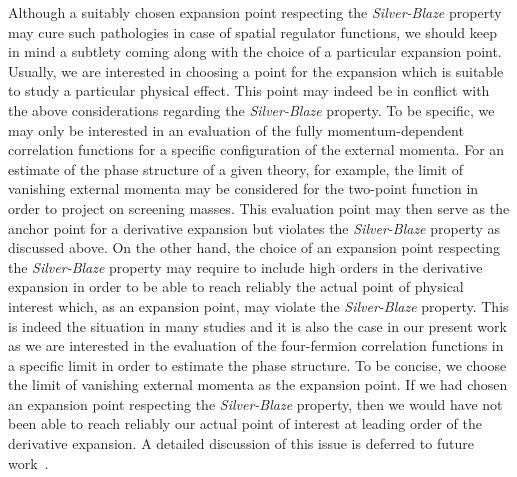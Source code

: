 \documentclass[prd,english,preprintnumbers,amsmath,amssymb,nofootinbib,twocolumn,superscriptaddress]{revtex4-1}
\begin{document}
{{Although a suitably chosen expansion point respecting the {\it Silver-Blaze} property may cure
such pathologies in case of spatial regulator functions, we should keep in mind 
a subtlety coming along with the choice of a particular expansion point. Usually,
we are interested in choosing a point for the expansion which is suitable to study a particular physical effect. 
This point may indeed be in conflict with the above considerations
regarding the {\it Silver-Blaze} property.
To be specific, we may only be interested in an evaluation of the fully momentum-dependent 
correlation functions for a specific
configuration of the external momenta. For an estimate of the phase structure of a given theory,
for example, the limit of vanishing external momenta may be considered for the two-point function in order to project
on screening masses.
This evaluation point may then serve as the anchor point for a derivative expansion but
violates the {\it Silver-Blaze} property as discussed above. On the other hand, the choice of an expansion
point respecting the {\it Silver-Blaze} property may require to include high orders in the derivative expansion
in order to be able to reach {reliably the actual point of physical interest which, as an expansion point, 
may violate the
{\it Silver-Blaze} property}. This is indeed the situation in many studies and it is also the case in our present 
work as we are interested in the evaluation of the four-fermion correlation functions in a specific limit
in order to estimate the phase structure. To be concise, we choose the limit of vanishing external momenta
as the expansion point. If we had chosen an expansion
point respecting the {\it Silver-Blaze} property, then we would have not been able to reach reliably our actual point of interest
at leading order of the derivative expansion. 
A detailed discussion of this issue is deferred to future work~\cite{BraunLeonhPawlo}. 

}}
\end{document}
